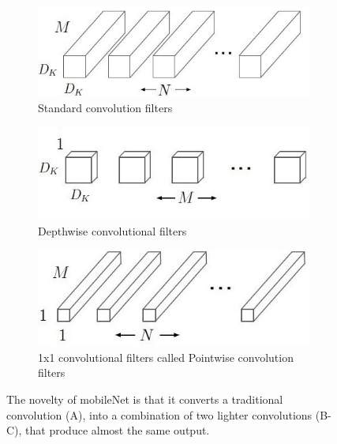 \begin{figure}[!h]
	\centering
	\begin{subfigure}{0.32\textwidth}
		\includegraphics[width=\linewidth]{images/detection/architecture_mobileNet1}
		\caption{Standard convolution filters}
		\label{fig:sub_architecture_mobileNet1}
	\end{subfigure}
	\begin{subfigure}{0.32\textwidth}
		\includegraphics[width=\linewidth]{images/detection/architecture_mobileNet2}
		\caption{Depthwise convolutional filters}
		\label{fig:sub_architecture_mobileNet2}
	\end{subfigure}
	\begin{subfigure}{0.32\textwidth}
		\includegraphics[width=\linewidth]{images/detection/architecture_mobileNet3}
		\caption{1x1 convolutional filters called Pointwise convolution filters}
		\label{fig:sub_architecture_mobileNet3}
	\end{subfigure}
	\captionsetup{margin=0.5cm}
	\caption[The schemes of convolutions introduced by mobileNet.]{The novelty of mobileNet is that it converts a traditional convolution (A), into a combination of two lighter convolutions (B-C), that produce almost the same output.}
	\label{fig:architecture_mobileNet}
\end{figure}


